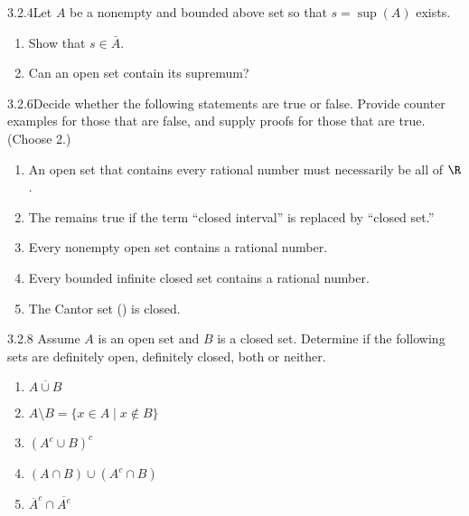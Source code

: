 \begin{exercise}
    {3.2.4}Let \(A\) be a nonempty and bounded above set so that \(s = \sup(A)\) exists. 
    \begin{enumerate}
        \item Show that \(s \in \bar{A}\).
        \item Can an open set contain its supremum?
    \end{enumerate}
\end{exercise}


\begin{exercise}
    {3.2.6}Decide whether the following statements are true or false. Provide counter examples for those that are false, and supply proofs for those that are true. (Choose 2.)
    \begin{enumerate}
        \item An open set that contains every rational number must necessarily be all of \(\R\).
        \item The  remains true if the term ``closed interval'' is replaced by ``closed set.''
        \item Every nonempty open set contains a rational number.
        \item Every bounded infinite closed set contains a rational number.
        \item The Cantor set () is closed. 
    \end{enumerate}
\end{exercise}


\begin{exercise}
    {3.2.8} Assume \(A\) is an open set and \(B\) is a closed set. Determine if the following sets are definitely open, definitely closed, both or neither.
    \begin{enumerate}
        \item \(\overline{A \cup B}\)
        \item \(A \setminus B = \{x \in A \mid x \notin B\}\)
        \item \((A^c \cup B)^c\)
        \item \((A \cap B) \cup (A^c \cap B)\)
        \item \(\overline{A}^c \cap \overline{A^c}\)
    \end{enumerate}
\end{exercise}

